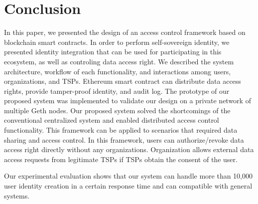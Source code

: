 \chapter{Conclusion}
\label{chapter:conclusion}

In this paper, we presented the design of an access control framework based on blockchain smart contracts. In order to perform self-sovereign identity, we presented identity integration that can be used for participating in this ecosystem, as well as controling data access right. We described the system architecture, workflow of each functionality, and interactions among users, organizations, and TSPs.
Ethereum smart contract can distribute data access rights, provide tamper-proof identity, and audit log. The prototype of our proposed system was implemented to validate our design on a private network of multiple Geth nodes. Our proposed system solved the shortcomings of the conventional centralized system and enabled distributed access control functionality. This framework can be applied to scenarios that required data sharing and access control. In this framework, users can authorize/revoke data access right directly without any organizations. Organization allows external data access requests from legitimate TSPs if TSPs obtain the consent of the user.\par
Our experimental evaluation shows that our system can handle more than 10,000 user identity creation in a certain response time and can compatible with general systems.